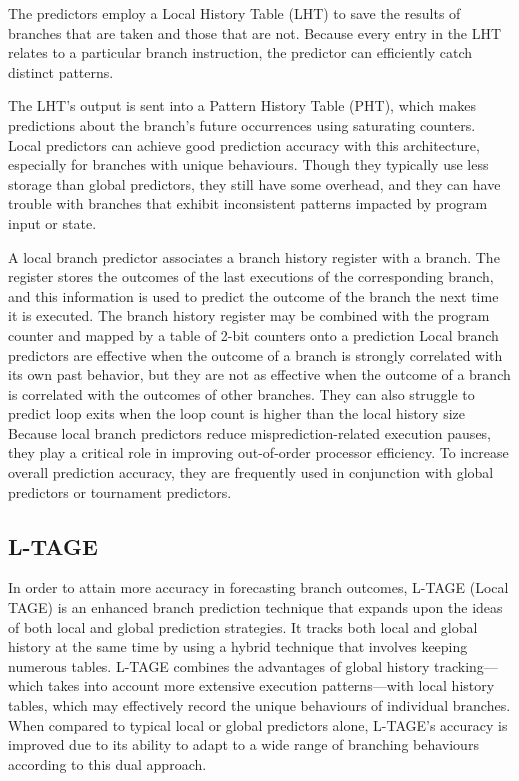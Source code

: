 \documentclass[10pt,journal,compsoc]{IEEEtran}
\begin{document}
The predictors employ a Local History Table (LHT) to save the results of branches that are taken and those that are not. 
Because every entry in the LHT relates to a particular branch instruction, the predictor can efficiently catch distinct patterns. 

The LHT's output is sent into a Pattern History Table (PHT), which makes predictions about the branch's future occurrences using saturating counters. Local predictors can achieve good prediction accuracy with this architecture, especially for branches with unique behaviours.
Though they typically use less storage than global predictors, they still have some overhead, and they can have trouble with branches that exhibit inconsistent patterns impacted by program input or state. 

A local branch predictor associates a branch history register with a branch. The register stores the outcomes of the last executions of the corresponding branch, and this information is used to predict the outcome of the branch the next time it is executed. The branch history register may be combined with the program counter and mapped by a table of 2-bit counters onto a prediction\cite{hoogerbruggeDynamicBranchPrediction2000a}
Local branch predictors are effective when the outcome of a branch is strongly correlated with its own past behavior, but they are not as effective when the outcome of a branch is correlated with the outcomes of other branches. They can also struggle to predict loop exits when the loop count is higher than the local history size\cite{mittalSurveyTechniquesDynamic2018}
Because local branch predictors reduce misprediction-related execution pauses, they play a critical role in improving out-of-order processor efficiency. To increase overall prediction accuracy, they are frequently used in conjunction with global predictors or tournament predictors.\cite{mittalSurveyTechniquesDynamic2018}
\subsection{L-TAGE}
\noindent In order to attain more accuracy in forecasting branch outcomes, L-TAGE (Local TAGE) is an enhanced branch prediction technique that expands upon the ideas of both local and global prediction strategies. It tracks both local and global history at the same time by using a hybrid technique that involves keeping numerous tables. L-TAGE combines the advantages of global history tracking—which takes into account more extensive execution patterns—with local history tables, which may effectively record the unique behaviours of individual branches. When compared to typical local or global predictors alone, L-TAGE's accuracy is improved due to its ability to adapt to a wide range of branching behaviours according to this dual approach.
\end{document}
